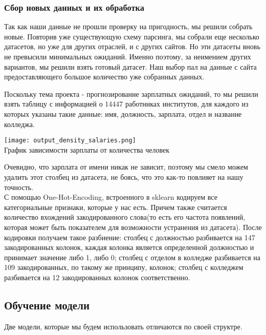\documentclass{article}
\begin{document}
\subsubsection{Сбор новых данных и их обработка}
  


Так как наши данные не прошли проверку на пригодность, мы решили собрать новые. Повторив уже существующую схему парсинга, мы собрали еще несколько датасетов, но уже для других отраслей, и с других сайтов\cite{WEBSITE:10}. Но эти датасеты вновь не превысили минимальных ожиданий. Именно поэтому, за неимением других вариантов, мы решили взять готовый датасет. Наш выбор пал на данные с сайта предоставляющего большое количество уже собранных данных\cite{WEBSITE:4}.

Поскольку тема проекта - прогнозирование зарплатных ожиданий, то мы решили взять таблицу с информацией о 14447 работниках институтов, для каждого из которых указаны такие данные: имя, должность, зарплата, отдел и название колледжа.\\
\begin{center}
\texttt{[image: output\_density\_salaries.png]}\\
График зависимости зарплаты от количества человек\\
\end{center}
Очевидно, что зарплата от имени никак не зависит, поэтому мы смело можем удалить этот столбец из датасета, не боясь, что это как-то повлияет на нашу точность.\\

С помощью One-Hot-Encoding\cite{WEBSITE:4}, встроенного в sklearn кодируем все категориальные признаки, которые у нас есть. Причем также считается количество вхождений закодированного слова(то есть его частота появлений, которая может быть показателем для возможности устранения из датасета). После кодировки получаем такое разбиение: столбец с должностью разбивается на 147 закодированных колонок, каждая колонка является определенной должностью и принимает значение либо 1, либо 0; столбец с отделом в колледже разбивается на 109 закодированных, по такому же принципу, колонок; столбец с колледжем разбивается на 12 закодированных колонок соответственно.

\subsection{Обучение модели}

Две модели, которые мы будем использовать отличаются по своей структре.
\end{document}

